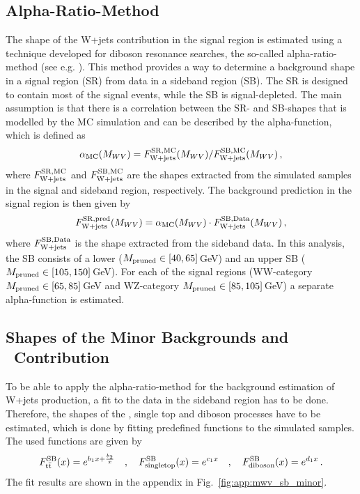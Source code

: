 \subsection{Alpha-Ratio-Method}
\label{sec:AlphaRatioMethod}
The shape of the W+jets contribution in the signal region is estimated using a technique developed for diboson resonance searches, the so-called alpha-ratio-method (see e.g. \cite{resonancepas}). This method provides a way to determine a background shape in a signal region (SR) from data in a sideband region (SB). The SR is designed to contain most of the signal events, while the SB is signal-depleted. The main assumption is that there is a correlation between the SR- and SB-shapes that is modelled by the MC simulation and can be described by the alpha-function, which is defined as
\begin{align}
\alpha_{\rm MC}(M_{WV})=F_{\rm W+jets}^{\rm SR,MC}(M_{WV})/F_{\rm W+jets}^{\rm SB,MC}(M_{WV}) \, ,
\end{align}
where $F_{\rm W+jets}^{\rm SR,MC}$ and $F_{\rm W+jets}^{\rm SB,MC}$ are the shapes extracted from the simulated samples in the signal and sideband region, respectively. The background prediction in the signal region is then given by
\begin{equation}
F_{\rm W+jets}^{\rm SR,pred}(M_{WV})=\alpha_{\rm MC}(M_{WV})\cdot F_{\rm W+jets}^{\rm SB,Data}(M_{WV}) \, ,
\end{equation}
where $F_{\rm W+jets}^{\rm SB,Data}$ is the shape extracted from the sideband data. In this analysis, the SB consists of a lower ($M_\mathrm{pruned} \in [40,65]$\,GeV) and an upper SB ($M_\mathrm{pruned} \in [105,150]$\,GeV). For each of the signal regions (WW-category $M_\mathrm{pruned} \in [65,85]$\,GeV and WZ-category $M_\mathrm{pruned} \in [85,105]$\,GeV) a separate alpha-function is estimated.

\subsection{Shapes of the Minor Backgrounds and \ttbar \ Contribution}
\label{sec:minbkgshapes}
To be able to apply the alpha-ratio-method for the background estimation of W+jets production, a fit to the data in the sideband region has to be done. Therefore, the shapes of the \ttbar , single top and diboson processes have to be estimated, which is done by fitting predefined functions to the simulated samples. The used functions are given by
\begin{equation}
F_{\mathrm{t}\bar{\mathrm{t}}}^{\rm SB}(x) = e^{b_1x+\frac{b_2}{x}} \quad , \quad
F_{\rm singletop}^{\rm SB}(x) = e^{c_1x} \quad , \quad 
F_{\rm diboson}^{\rm SB}(x) = e^{d_1x} \, .
\end{equation}
The fit results are shown in the appendix in Fig.~\ref{fig:app:mwv_sb_minor}.\\

